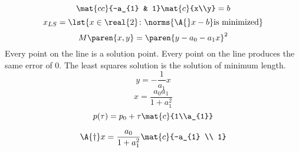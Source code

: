   \begin{equation*}   %
      \mat{cc}{-a_{1} & 1} 
      \mat{c}{x\\y} =
      b
  \end{equation*}
  \begin{equation*}   %
      x_{LS} = \lst{x\in\real{2}\colon \norms{\A{}x - b} \text{is minimized}}
  \end{equation*}
  \begin{equation*}   %
      M\paren{x,y} = \paren{y - a_{0} - a_{1} x}^{2}
  \end{equation*}
Every point on the line is a solution point. Every point on the line produces the same error of 0. 
The least squares solution is the solution of minimum length.
  \begin{equation*}   %
      y = -\frac{1}{a_{1}} x
  \end{equation*}
    \begin{equation*}   %
      x = \frac{a_{0} a_{1}} {1 + a_{1}^{2}}
  \end{equation*}
  \begin{equation*}   %
      p(\tau) = p_{0} + \tau \mat{c}{1\\a_{1}}
  \end{equation*}

  \begin{equation*}   %
      \A{\dagger} x = \frac{a_{0}}{1+a_{1}^2} \mat{c}{-a_{1} \\ 1}
  \end{equation*}

